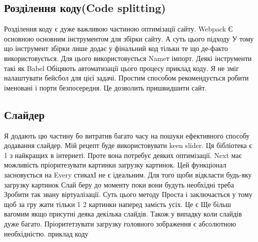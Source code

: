 \subsection{Розділення коду(Code splitting)}
Розділення коду є дуже важливою частиною оптимізації сайту.
Webpack Є основною основним інструментом для збірки сайту.
А суть цього підходу У тому що інструмент збірки лише додає у фінальний код тільки те що де-факто використовується.
Для цього використовується Nameт імпорт.
Деякі інструменти такі як Babel Обіцяють автоматизації цього процесу приклад коду.
Я не зміг налаштувати бейсбол для цієї задачі.
Простим способом рекомендується робити іменовані і порти безпосередня.
Це дозволить пришвидшити сайт.

\subsection{Слайдер}
Я додають цю частину бо витратив багато часу на пошуки ефективного способу додавання слайдер.
Мій рецепт буде використовувати keen slider.
Ця бібліотека є 1 з найкращих в інтернеті. Проте вона потребує деяких оптимізації.
Next має можливість пріоритезувати картинки загрузку картинок.
Цей функціонал засновується на Every стикахІ не є ідеальним.
Для того щоби відкласти будь-яку загрузку картинок Слай беру до моменту поки вони будуть необхідні треба Зробити так звану віртуалізації.
Суть цього методу Проста і заключається у тому щоб за гру жати тільки 1 2 картинки наперед замість усіх.
Це є Ще більш вагомим якщо присутні деяка декілька слайдів. Також у випадку коли слайдів дуже багато. Пріоритетзувати загрузку головного зображення є абсолютною необхідністю.
приклад коду
